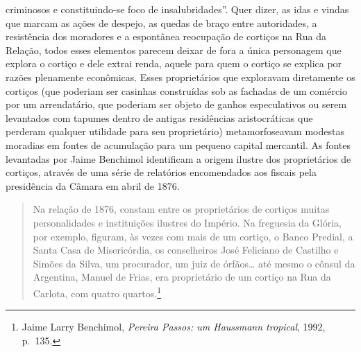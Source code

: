 criminosos e constituindo-se foco de insalubridades''. Quer dizer, as
idas e vindas que marcam as ações de despejo, as quedas de braço entre
autoridades, a resistência dos moradores e a espontânea reocupação de
cortiços na Rua da Relação, todos esses elementos parecem deixar de fora
a única personagem que explora o cortiço e dele extrai renda, aquele
para quem o cortiço se explica por razões plenamente econômicas. Esses
proprietários que exploravam diretamente os cortiços (que poderiam ser
casinhas construídas sob as fachadas de um comércio por um arrendatário,
que poderiam ser objeto de ganhos especulativos ou serem levantados com
tapumes dentro de antigas residências aristocráticas que perderam
qualquer utilidade para seu proprietário) metamorfoseavam modestas
moradias em fontes de acumulação para um pequeno capital mercantil. As
fontes levantadas por Jaime Benchimol identificam a origem ilustre dos
proprietários de cortiços, através de uma série de relatórios
encomendados aos fiscais pela presidência da Câmara em abril de 1876.

\begin{quote}
Na relação de 1876, constam entre os proprietários de cortiços muitas
personalidades e instituições ilustres do Império. Na freguesia da
Glória, por exemplo, figuram, às vezes com mais de um cortiço, o Banco
Predial, a Santa Casa de Misericórdia, os conselheiros José Feliciano de
Castilho e Simões da Silva, um procurador, um juiz de órfãos\dots{} até
mesmo o cônsul da Argentina, Manuel de Frias, era proprietário de um
cortiço na Rua da Carlota, com quatro quartos.\footnote{Jaime Larry
  Benchimol, \textit{Pereira Passos: um Haussmann tropical}, 1992, p.~135.}
\end{quote}

